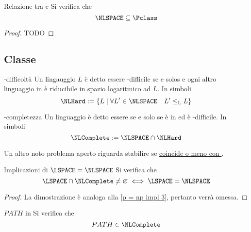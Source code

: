 \documentclass[a4paper, 12pt]{report}
\begin{document}
    \begin{framedthm}[label={nl in p}]{Relazione tra \NLSPACE e \Pclass}
        Si verifica che $$\NLSPACE \subseteq \Pclass$$
    \end{framedthm}

    \begin{proof}
        TODO
    \end{proof}

    \subsection{Classe \NLComplete}

    \begin{frameddefn}{\NLSPACE-difficoltà}
        Un lingauggio $L$ è detto essere \NLSPACE-difficile se e solos e ogni altro linguaggio in \NLSPACE è riducibile in spazio logaritmico ad $L$. In simboli $$\NLHard := \{L \mid \forall L' \in \NLSPACE \quad L' \leq_\mathrm L L\}$$
    \end{frameddefn}

    \begin{frameddefn}{\NLSPACE-completezza}
        Un linguaggio è detto essere  se e solo se è in \NLSPACE ed è \NLSPACE-difficile. In simboli $$\NLComplete := \NLSPACE \cap \NLHard$$
    \end{frameddefn}

    \begin{framedobs}{}
        Un altro noto problema aperto riguarda stabilire se \href{https://en.wikipedia.org/wiki/NL_(complexity)}{\LSPACE coincide o meno con \NLSPACE}.
    \end{framedobs}

    \begin{framedprop}{Implicazioni di $\LSPACE = \NLSPACE$}
        Si verifica che $$\LSPACE \cap \NLComplete \neq \varnothing \iff \LSPACE = \NLSPACE$$
    \end{framedprop}

    \begin{proof}
        La dimostrazione è analoga alla \cref{p = np impl 3}, pertanto verrà omessa.
    \end{proof}

    \begin{framedthm}{$PATH$ in \NLComplete}
        Si verifica che $$PATH \in \NLComplete$$
    \end{framedthm}
\end{document}
